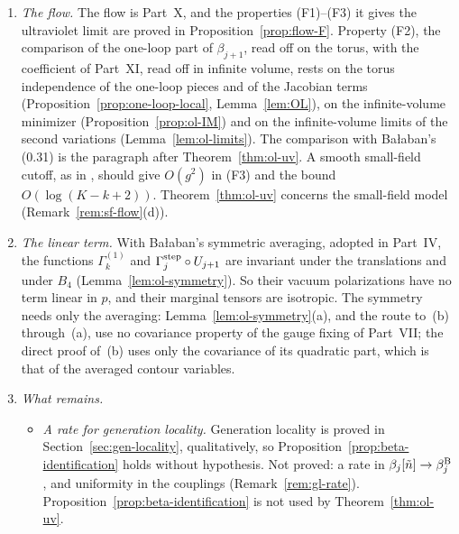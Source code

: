 \begin{remark}\label{rem:ol-remains}
\begin{enumerate}[label=(\alph*)]
\item \emph{The flow.} The flow is Part~X, and the properties (F1)--(F3) it gives the ultraviolet limit are proved in Proposition~\ref{prop:flow-F}. Property (F2), the comparison of the one-loop part of $\beta_{j+1}$, read off on the torus, with the coefficient of Part~XI, read off in infinite volume, rests on the torus independence of the one-loop pieces and of the Jacobian terms (Proposition~\ref{prop:one-loop-local}, Lemma~\ref{lem:OL}), on the infinite-volume minimizer (Proposition~\ref{prop:ol-IM}) and on the infinite-volume limits of the second variations (Lemma~\ref{lem:ol-limits}). The comparison with Ba\l aban's (0.31) is the paragraph after Theorem~\ref{thm:ol-uv}. A smooth small-field cutoff, as in \cite[(2.9)]{BalYM4I}, should give $O(g^2)$ in (F3) and the bound $O(\log(K-k+2))$. Theorem~\ref{thm:ol-uv} concerns the small-field model (Remark~\ref{rem:sf-flow}(d)).
\item \emph{The linear term.} With Ba\l aban's symmetric averaging, adopted in Part~IV, the functions $\Gamma^{(1)}_k$ and $\Gamma^{\rm step}_j\circ U_{j+1}$ are invariant under the translations and under $B_4$ (Lemma~\ref{lem:ol-symmetry}). So their vacuum polarizations have no term linear in $p$, and their marginal tensors are isotropic. The symmetry needs only the averaging: Lemma~\ref{lem:ol-symmetry}(a), and the route to~(b) through~(a), use no covariance property of the gauge fixing of Part~VII; the direct proof of~(b) uses only the covariance of its quadratic part, which is that of the averaged contour variables.
\item \emph{What remains.}
  \begin{itemize}
  \item \emph{A rate for generation locality.} Generation locality is proved in Section~\ref{sec:gen-locality}, qualitatively, so Proposition~\ref{prop:beta-identification} holds without hypothesis. Not proved: a rate in $\beta_j[\tilde n]\to\beta^{\rm B}_j$, and uniformity in the couplings (Remark~\ref{rem:gl-rate}). Proposition~\ref{prop:beta-identification} is not used by Theorem~\ref{thm:ol-uv}.

\end{itemize}
\end{enumerate}
\end{remark}
